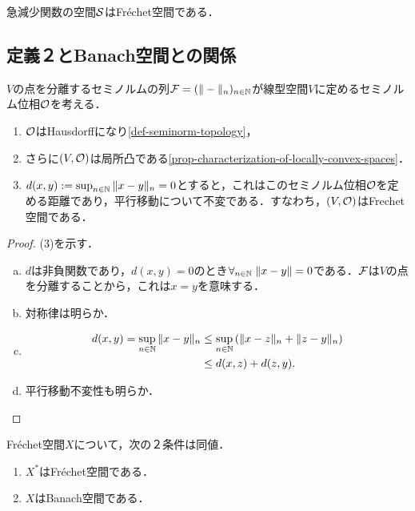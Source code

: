 \documentclass[uplatex,dvipdfmx]{jsreport}
\begin{document}
\begin{example}
    急減少関数の空間$\mathcal{S}$はFréchet空間である．
\end{example}

\subsection{定義２とBanach空間との関係}

\begin{definition}[ゲージ空間としての捉え方]
    $V$の点を分離するセミノルムの列$\mathcal{F}=(\|-\|_n)_{n\in\mathbb{N}}$が線型空間$V$に定めるセミノルム位相$\mathcal{O}$を考える．
    \begin{enumerate}
        \item $\mathcal{O}$はHausdorffになり\ref{def-seminorm-topology}，
        \item さらに$(V,\mathcal{O})$は局所凸である\ref{prop-characterization-of-locally-convex-spaces}．
        \item $d(x,y):=\sup_{n\in\mathbb{N}}\|x-y\|_n=0$とすると，これはこのセミノルム位相$\mathcal{O}$を定める距離であり，平行移動について不変である．すなわち，$(V,\mathcal{O})$はFrechet空間である．
    \end{enumerate}
\end{definition}
\begin{proof}
    (3)を示す．
    \begin{enumerate}[(a)]
        \item $d$は非負関数であり，$d(x,y)=0$のとき$\forall_{n\in\mathbb{N}}\;\|x-y\|=0$である．$\mathcal{F}$は$V$の点を分離することから，これは$x=y$を意味する．
        \item 対称律は明らか．
        \item \begin{align*}
            d(x,y)=\sup_{n\in\mathbb{N}}\|x-y\|_n&\le\sup_{n\in\mathbb{N}}\left(\|x-z\|_n+\|z-y\|_n\right)\\
            &\le d(x,z)+d(z,y).
        \end{align*}
        \item 平行移動不変性も明らか．
    \end{enumerate}
\end{proof}

\begin{proposition}[Banach空間との関係]
    Fréchet空間$X$について，次の２条件は同値．
    \begin{enumerate}
        \item $X^*$はFréchet空間である．
        \item $X$はBanach空間である．
    \end{enumerate}
\end{proposition}
\end{document}
